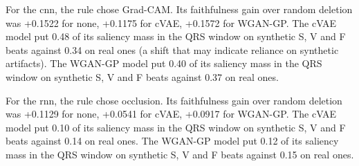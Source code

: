For the cnn, the rule chose Grad-CAM. Its faithfulness gain over random deletion was +0.1522 for none, +0.1175 for cVAE, +0.1572 for WGAN-GP. The cVAE model put 0.48 of its saliency mass in the QRS window on synthetic S, V and F beats against 0.34 on real ones (a shift that may indicate reliance on synthetic artifacts). The WGAN-GP model put 0.40 of its saliency mass in the QRS window on synthetic S, V and F beats against 0.37 on real ones.

For the rnn, the rule chose occlusion. Its faithfulness gain over random deletion was +0.1129 for none, +0.0541 for cVAE, +0.0917 for WGAN-GP. The cVAE model put 0.10 of its saliency mass in the QRS window on synthetic S, V and F beats against 0.14 on real ones. The WGAN-GP model put 0.12 of its saliency mass in the QRS window on synthetic S, V and F beats against 0.15 on real ones.
